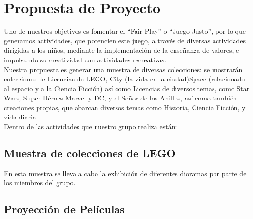 \documentclass[]{article}
\begin{document}
\section{Propuesta de Proyecto}

Uno de nuestros objetivos es fomentar el “Fair Play” o “Juego Justo”, por lo que generamos actividades, que potencien este juego, a través de diversas actividades dirigidas a los niños, mediante la implementación de la enseñanza de valores, e impulsando su creatividad con actividades recreativas.\\

Nuestra propuesta es generar una muestra de diversas colecciones: se mostrarán colecciones de Licencias de LEGO, City (la vida en la ciudad)Space (relacionado al espacio y a la Ciencia Ficción) así como Licencias de diversos temas, como Star Wars, Super Héroes Marvel y DC, y el Señor de los Anillos, así como también creaciones propias, que abarcan diversos temas como Historia, Ciencia Ficción, y vida diaria.\\


Dentro de las actividades que nuestro grupo realiza están:


\subsection{Muestra de colecciones de LEGO}

En esta muestra se lleva a cabo la exhibición de diferentes dioramas por parte de los miembros del grupo.





\subsection{Proyección de Películas}
\end{document}
